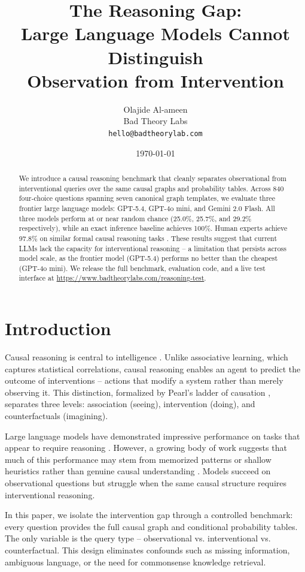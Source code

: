 \documentclass[11pt,a4paper]{article}
\title{The Reasoning Gap:\\[4pt]Large Language Models Cannot Distinguish\\[2pt]Observation from Intervention}
\author{%
  Olajide Al-ameen\\
  Bad Theory Labs\\
  \texttt{hello@badtheorylab.com}
}
\date{\today}
\begin{document}
\maketitle

\begin{abstract}
We introduce a causal reasoning benchmark that cleanly separates observational from interventional queries over the same causal graphs and probability tables. Across 840 four-choice questions spanning seven canonical graph templates, we evaluate three frontier large language models: GPT-5.4, GPT-4o mini, and Gemini 2.0 Flash. All three models perform at or near random chance (25.0\%, 25.7\%, and 29.2\% respectively), while an exact inference baseline achieves 100\%. Human experts achieve 97.8\% on similar formal causal reasoning tasks \cite{counterbench}. These results suggest that current LLMs lack the capacity for interventional reasoning -- a limitation that persists across model scale, as the frontier model (GPT-5.4) performs no better than the cheapest (GPT-4o mini). We release the full benchmark, evaluation code, and a live test interface at \url{https://www.badtheorylabs.com/reasoning-test}.
\end{abstract}

\section{Introduction}

Causal reasoning is central to intelligence \cite{pearl2009causality}. Unlike associative learning, which captures statistical correlations, causal reasoning enables an agent to predict the outcome of interventions -- actions that modify a system rather than merely observing it. This distinction, formalized by Pearl's ladder of causation \cite{pearl2014causal,pearl2019book}, separates three levels: association (seeing), intervention (doing), and counterfactuals (imagining).

Large language models have demonstrated impressive performance on tasks that appear to require reasoning \cite{wei2022chain,kojima2022large}. However, a growing body of work suggests that much of this performance may stem from memorized patterns or shallow heuristics rather than genuine causal understanding \cite{jin2024cladder,zecevic2023causal,kiciman2024causal}. Models succeed on observational questions but struggle when the same causal structure requires interventional reasoning.

In this paper, we isolate the intervention gap through a controlled benchmark: every question provides the full causal graph and conditional probability tables. The only variable is the query type -- observational vs. interventional vs. counterfactual. This design eliminates confounds such as missing information, ambiguous language, or the need for commonsense knowledge retrieval.
\end{document}
